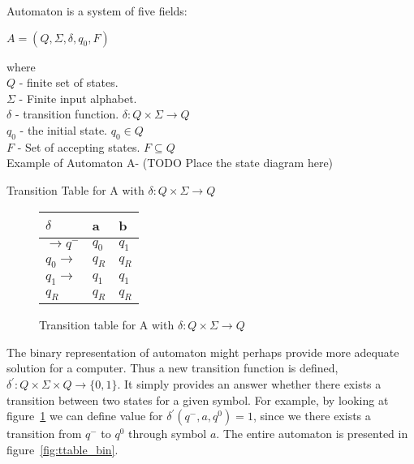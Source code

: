 \documentclass[runningheads,a4paper]{llncs}
\begin{document}
Automaton is a system of five fields:
\begin{center}
	$A = (Q, \Sigma, \delta, q_0, F)$
\end{center}

where \\
$Q$ - finite set of states. \\
$\Sigma$ - Finite input alphabet. \\
$\delta$ - transition function. $\delta: Q \times \Sigma \rightarrow Q$ \\
$q_0$ - the initial state. $q_0 \in Q$ \\
$F$ - Set of accepting states. $F \subseteq Q$ \\

Example of Automaton A- {\color{red}(TODO Place the state diagram here)}

Transition Table for A with $\delta: Q \times \Sigma \rightarrow Q$ 

\begin{figure}
\begin{center}

	\setlength{\tabcolsep}{4pt}
	\renewcommand{\arraystretch}{1.5}
	
	\begin{tabular}{|P{1.0cm} || P{0.6cm} | P{0.6cm} |}
	\hline
	$\delta$ & a & b \\
	\hline
	\hline
	$\rightarrow q^-$ 		& $q_0$ & $q_1$ \\
	\hline
	$q_0 \rightarrow$ 		& $q_R$ & $q_R$ \\
	\hline
	$q_1 \rightarrow$ 		& $q_1$ & $q_1$ \\
	\hline
	$q_R$  					& $q_R$ & $q_R$ \\
	\hline
	\end{tabular}

	
\caption{Transition table for A with $\delta: Q \times \Sigma \rightarrow Q$}
\label{fig:ttable_std}
\end{center}
\end{figure}


The binary representation of automaton might perhaps provide more adequate solution for a computer. Thus a new transition function is defined, $\delta^{'}: Q \times \Sigma \times Q \rightarrow \{0,1\}$. It simply provides an answer whether there exists a transition between two states for a given symbol. For example, by looking at figure~\ref{fig:ttable_std} we can define value for $\delta^{'}(q^-,a,q^0) = 1$, since we there exists a transition from $q^-$ to $q^0$ through symbol $a$. The entire automaton is presented in figure~\ref{fig:ttable_bin}.
\end{document}
